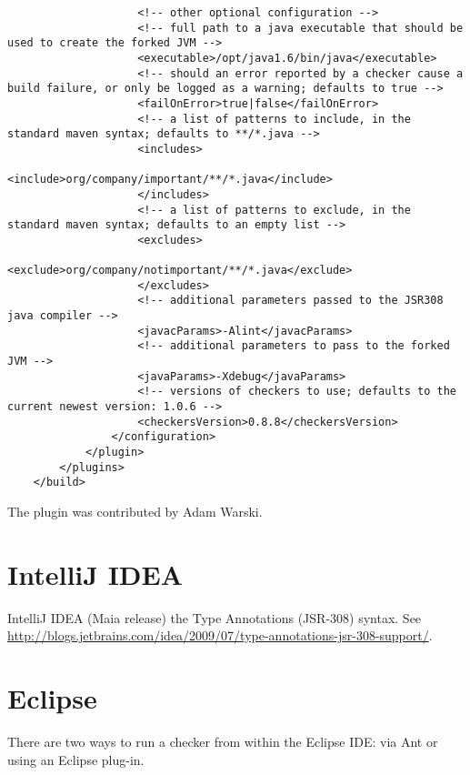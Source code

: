 \begin{enumerate}
\begin{Verbatim}
                    <!-- other optional configuration -->
                    <!-- full path to a java executable that should be used to create the forked JVM -->
                    <executable>/opt/java1.6/bin/java</executable>
                    <!-- should an error reported by a checker cause a build failure, or only be logged as a warning; defaults to true -->
                    <failOnError>true|false</failOnError>
                    <!-- a list of patterns to include, in the standard maven syntax; defaults to **/*.java -->
                    <includes>
                        <include>org/company/important/**/*.java</include>
                    </includes>
                    <!-- a list of patterns to exclude, in the standard maven syntax; defaults to an empty list -->
                    <excludes>
                        <exclude>org/company/notimportant/**/*.java</exclude>
                    </excludes>
                    <!-- additional parameters passed to the JSR308 java compiler -->
                    <javacParams>-Alint</javacParams>
                    <!-- additional parameters to pass to the forked JVM -->
                    <javaParams>-Xdebug</javaParams>
                    <!-- versions of checkers to use; defaults to the current newest version: 1.0.6 -->
                    <checkersVersion>0.8.8</checkersVersion>
                </configuration>
            </plugin>
        </plugins>
    </build>
\end{Verbatim}

\end{enumerate}

The plugin was contributed by Adam Warski.

\section{IntelliJ IDEA\label{intellij}}

IntelliJ IDEA (Maia release)
the Type Annotations (JSR-308) syntax.
See \url{http://blogs.jetbrains.com/idea/2009/07/type-annotations-jsr-308-support/}.

\section{Eclipse\label{eclipse}}

There are two ways to run a checker from within the Eclipse IDE:  via Ant
or using an Eclipse plug-in.


